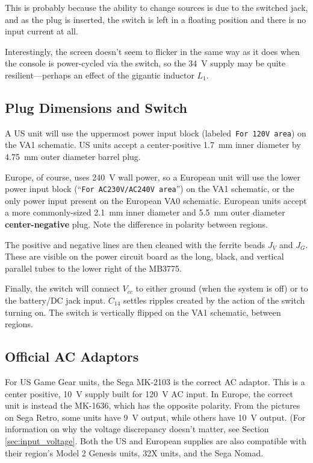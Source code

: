 \documentclass{article}
\newcommand{\Vcc}{$V_{cc}$}
\newcommand{\model}{\textsf}
\begin{document}
This is probably because the ability to change sources is due to the
switched jack, and as the plug is inserted, the switch is left in a
floating position and there is no input current at all.

Interestingly, the screen doesn't seem to flicker in the same way as
it does when the console is power-cycled via the switch, so the
\qty{34}{\volt} supply may be quite resilient---perhaps an effect of
the gigantic inductor $L_1$.

\subsection{Plug Dimensions and Switch}
\label{sec:plug_dimensions}
A US unit will use the uppermost power input block (labeled\,
\texttt{For 120V area}) on the \model{VA1} schematic. US units
accept a center-positive \qty{1.7}{\milli\meter} inner diameter by
\qty{4.75}{\milli\meter} outer diameter barrel plug.

Europe, of course, uses \qty{240}{\volt} wall power, so a European
unit will use the lower power input block (``\texttt{For AC230V/AC240V
  area}'') on the \model{VA1} schematic, or the only power input
present on the European \model{VA0} schematic. European units accept a
more commonly-sized \qty{2.1}{\milli\meter} inner diameter and
\qty{5.5}{\milli\meter} outer diameter \textbf{center-negative}
plug. Note the difference in polarity between regions.

The positive and negative lines are then cleaned with the ferrite
beads $J_V$ and $J_G$. These are visible on the power circuit board as
the long, black, and vertical parallel tubes to the lower right of the
\model{MB3775}.

Finally, the switch will connect \Vcc{} to either ground (when the
system is off) or to the battery/DC jack input. $C_{14}$ settles
ripples created by the action of the switch turning on. The switch is
vertically flipped on the \model{VA1} schematic, between regions.

\subsection{Official AC Adaptors}
\label{sec:ac_adaptors}
For US Game Gear units, the Sega \model{MK-2103} is the correct AC
adaptor. This is a center positive, \qty{10}{\volt} supply built for
\qty{120}{\volt} AC input. In Europe, the correct unit is instead the
\model{MK-1636}, which has the opposite polarity. From the pictures on
Sega Retro, some units have \qty{9}{\volt} output, while others have
\qty{10}{\volt} output. (For information on why the voltage
discrepancy doesn't matter, see Section \ref{sec:input_voltage}. Both
the US and European supplies are also compatible with their region's
Model 2 Genesis units, 32X units, and the Sega Nomad.
\end{document}
